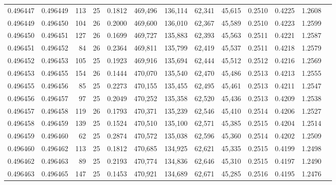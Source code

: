 \begin{tabular}{rrrrrrrrrrrrr}
0.496447 & 0.496449 & 113 &  25 &                                     0.1812 & 469,496 & 136,114 &  62,341 &  45,615 & 0.2510 & 0.4225 & 1.2608 \\
0.496449 & 0.496450 & 104 &  26 &                                     0.2000 & 469,600 & 136,010 &  62,367 &  45,589 & 0.2510 & 0.4223 & 1.2599 \\
0.496450 & 0.496451 & 127 &  26 &                                     0.1699 & 469,727 & 135,883 &  62,393 &  45,563 & 0.2511 & 0.4221 & 1.2587 \\
0.496451 & 0.496452 &  84 &  26 &                                     0.2364 & 469,811 & 135,799 &  62,419 &  45,537 & 0.2511 & 0.4218 & 1.2579 \\
0.496452 & 0.496453 & 105 &  25 &                                     0.1923 & 469,916 & 135,694 &  62,444 &  45,512 & 0.2512 & 0.4216 & 1.2569 \\
0.496453 & 0.496455 & 154 &  26 &                                     0.1444 & 470,070 & 135,540 &  62,470 &  45,486 & 0.2513 & 0.4213 & 1.2555 \\
0.496455 & 0.496456 &  85 &  25 &                                     0.2273 & 470,155 & 135,455 &  62,495 &  45,461 & 0.2513 & 0.4211 & 1.2547 \\
0.496456 & 0.496457 &  97 &  25 &                                     0.2049 & 470,252 & 135,358 &  62,520 &  45,436 & 0.2513 & 0.4209 & 1.2538 \\
0.496457 & 0.496458 & 119 &  26 &                                     0.1793 & 470,371 & 135,239 &  62,546 &  45,410 & 0.2514 & 0.4206 & 1.2527 \\
0.496458 & 0.496459 & 139 &  25 &                                     0.1524 & 470,510 & 135,100 &  62,571 &  45,385 & 0.2515 & 0.4204 & 1.2514 \\
0.496459 & 0.496460 &  62 &  25 &                                     0.2874 & 470,572 & 135,038 &  62,596 &  45,360 & 0.2514 & 0.4202 & 1.2509 \\
0.496460 & 0.496462 & 113 &  25 &                                     0.1812 & 470,685 & 134,925 &  62,621 &  45,335 & 0.2515 & 0.4199 & 1.2498 \\
0.496462 & 0.496463 &  89 &  25 &                                     0.2193 & 470,774 & 134,836 &  62,646 &  45,310 & 0.2515 & 0.4197 & 1.2490 \\
0.496463 & 0.496465 & 147 &  25 &                                     0.1453 & 470,921 & 134,689 &  62,671 &  45,285 & 0.2516 & 0.4195 & 1.2476 \\

\end{tabular}
